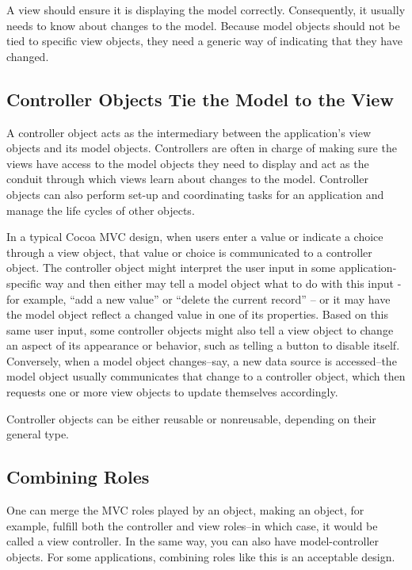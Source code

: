 A view should ensure it is displaying the model correctly. Consequently, it
usually needs to know about changes to the model. Because model objects should
not be tied to specific view objects, they need a generic way of indicating that
they have changed.

\subsection{Controller Objects Tie the Model to the View}

A controller object acts as the intermediary between the application's view
objects and its model objects. Controllers are often in charge of making sure
the views have access to the model objects they need to display and act as the
conduit through which views learn about changes to the model. Controller objects
can also perform set-up and coordinating tasks for an application and manage the
life cycles of other objects.

In a typical Cocoa MVC design, when users enter a value or indicate a choice
through a view object, that value or choice is communicated to a controller
object. The controller object might interpret the user input in some
application-specific way and then either may tell a model object what to do with
this input - for example, ``add a new value'' or ``delete the current record'' -- or it
may have the model object reflect a changed value in one of its properties.
Based on this same user input, some controller objects might also tell a view
object to change an aspect of its appearance or behavior, such as telling a
button to disable itself. Conversely, when a model object changes--say, a new
data source is accessed--the model object usually communicates that change to a
controller object, which then requests one or more view objects to update
themselves accordingly.

Controller objects can be either reusable or nonreusable, depending on their
general type.

\subsection{Combining Roles}

One can merge the MVC roles played by an object, making an object, for example,
fulfill both the controller and view roles--in which case, it would be called a
view controller. In the same way, you can also have model-controller objects.
For some applications, combining roles like this is an acceptable design.

